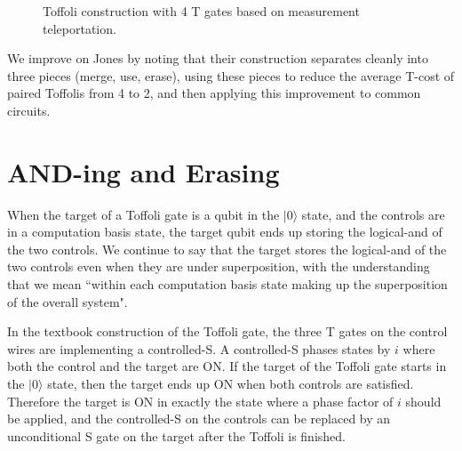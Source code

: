 \documentclass[twocolumn,longbibliography]{quantumarticle-customized}
\newcommand{\qH}{\gate{H}}
\newcommand{\qT}{\gate{T}}
\newcommand{\qTi}{\gate{T^\dagger}}
\newcommand{\qSi}{\gate{S^\dagger}}
\newcommand{\qO}{\lstick{|0\rangle}}
\begin{document}
\begin{figure}
  \resizebox{\linewidth}{!}{
    \Qcircuit @R=1.5em @C=0.7em {
      &\ctrl{1} &\qw & &   & & &     &\qw &\qw &\qw      &\qw  &\ctrl{3} &\qw &\qw      &\qw  &\qw &\qw  &\qw       &\qw &\qw    &\ctrl{1}       &\qw \\
      &\ctrl{1} &\qw & & = & & &     &\qw &\qw &\ctrl{2} &\qw  &\qw      &\qw &\ctrl{2} &\qw  &\qw &\qw  &\qw       &\qw &\qw    &\gate{Z}       &\qw \\
      &\targ    &\qw & &   & & &     &\qw &\qw &\qw      &\qw  &\qw      &\qw &\qw      &\qw  &\qw &\qw  &\targ     &\qw &\qw    &\qw\cwx        &\qw \\
      &         &    & &   & & & \qO &\qH &\qT &\targ    &\qTi &\targ    &\qT &\targ    &\qTi &\qH &\qSi &\ctrl{-1} &\qH &\meter &\cw\cwx\bullet & \\
    }
  }
  \caption{
	Toffoli construction with 4 T gates based on measurement teleportation.
  }
  \label{fig:jones-toffoli}
\end{figure}

We improve on Jones by noting that their construction separates cleanly into three pieces (merge, use, erase), using these pieces to reduce the average T-cost of paired Toffolis from 4 to 2, and then applying this improvement to common circuits.







\section{AND-ing and Erasing}
\label{sec:temporary-and}

When the target of a Toffoli gate is a qubit in the $|0\rangle$ state, and the controls are in a computation basis state, the target qubit ends up storing the logical-and of the two controls.
We continue to say that the target stores the logical-and of the two controls even when they are under superposition, with the understanding that we mean ``within each computation basis state making up the superposition of the overall system".

In the textbook construction of the Toffoli gate, the three T gates on the control wires are implementing a controlled-S.
A controlled-S phases states by $i$ where both the control and the target are ON.
If the target of the Toffoli gate starts in the $|0\rangle$ state, then the target ends up ON when both controls are satisfied.
Therefore the target is ON in exactly the state where a phase factor of $i$ should be applied, and the controlled-S on the controls can be replaced by an unconditional S gate on the target after the Toffoli is finished.
\end{document}
